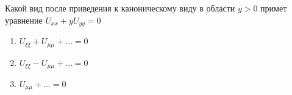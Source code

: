 Какой вид после приведения к каноническому виду в области \(y > 0\) примет уравнение \(U_{xx}+yU_{yy}=0\)

\begin{enumerate}[label=\arabic*)]
    \item \(U_{\xi \xi }+U_{\mu \mu }+\dots =0\)
    \item \(U_{\xi \xi }-U_{\mu \mu }+\dots =0\)
    \item \(U_{\mu \mu }+\dots =0\)
\end{enumerate}

